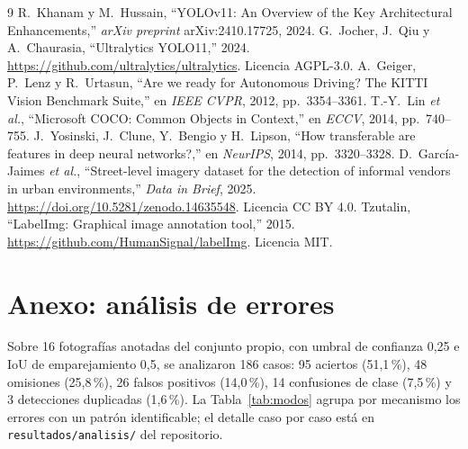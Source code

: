 \documentclass[10pt,a4paper]{article}
\begin{document}
\begin{thebibliography}{9}\scriptsize
\setlength{\itemsep}{1pt}\setlength{\parskip}{0pt}
 R.~Khanam y M.~Hussain, ``YOLOv11: An Overview of the Key Architectural
Enhancements,'' \emph{arXiv preprint} arXiv:2410.17725, 2024.
 G.~Jocher, J.~Qiu y A.~Chaurasia, ``Ultralytics YOLO11,'' 2024.
\url{https://github.com/ultralytics/ultralytics}. Licencia AGPL-3.0.
 A.~Geiger, P.~Lenz y R.~Urtasun, ``Are we ready for Autonomous Driving?
The KITTI Vision Benchmark Suite,'' en \emph{IEEE CVPR}, 2012, pp.~3354--3361.
 T.-Y.~Lin \emph{et al.}, ``Microsoft COCO: Common Objects in Context,'' en
\emph{ECCV}, 2014, pp.~740--755.
 J.~Yosinski, J.~Clune, Y.~Bengio y H.~Lipson, ``How transferable are
features in deep neural networks?,'' en \emph{NeurIPS}, 2014, pp.~3320--3328.
 D.~García-Jaimes \emph{et al.}, ``Street-level imagery dataset for
the detection of informal vendors in urban environments,'' \emph{Data in Brief}, 2025.
\url{https://doi.org/10.5281/zenodo.14635548}. Licencia CC BY 4.0.
 Tzutalin, ``LabelImg: Graphical image annotation tool,'' 2015.
\url{https://github.com/HumanSignal/labelImg}. Licencia MIT.
\end{thebibliography}

\appendix
\section{Anexo: análisis de errores}
\label{anexo:errores}
Sobre 16 fotografías anotadas del conjunto propio, con umbral de confianza 0{,}25 e IoU de
emparejamiento 0{,}5, se analizaron 186 casos: 95 aciertos (51{,}1\,\%), 48 omisiones
(25{,}8\,\%), 26 falsos positivos (14{,}0\,\%), 14 confusiones de clase (7{,}5\,\%) y 3
detecciones duplicadas (1{,}6\,\%). La Tabla~\ref{tab:modos} agrupa por mecanismo los
errores con un patrón identificable; el detalle caso por caso está en
\texttt{resultados/analisis/} del repositorio.
\end{document}
